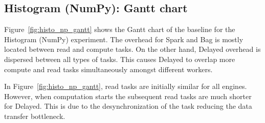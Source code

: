 \documentclass[conference]{IEEEtran}
\begin{document}
\subsection{Histogram (NumPy): Gantt chart}
Figure~\ref{fig:histo_np_gantt} shows the Gantt chart of the baseline for the
Histogram (NumPy) experiment. The overhead for Spark and Bag is mostly located
between read and compute tasks. On the other hand, Delayed
overhead is dispersed between all types of tasks. This causes Delayed to
overlap more compute and read tasks simultaneously amongst different workers.

In Figure~\ref{fig:histo_np_gantt}, read tasks are initially similar for all
engines. However, when computation starts the subsequent read tasks are much
shorter for Delayed. This is due to the desynchronization of the task reducing the
data transfer bottleneck.
\end{document}

